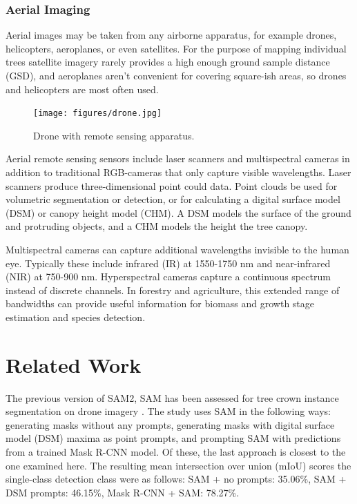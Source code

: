 \documentclass[english, 12pt, a4paper, sci, utf8, a-2b, online]{aaltothesis}
\begin{document}
\subsubsection{Aerial Imaging}

Aerial images may be taken from any airborne apparatus, for example drones, helicopters, aeroplanes, or even satellites. For the purpose of mapping individual trees satellite imagery rarely provides a high enough ground sample distance (GSD), and aeroplanes aren't convenient for covering square-ish areas, so drones and helicopters are most often used.

\begin{figure}[h]
    \centering
    \texttt{[image: figures/drone.jpg]}
    \caption{Drone with remote sensing apparatus.}
    \label{fig:drone}
\end{figure}

Aerial remote sensing sensors include laser scanners and multispectral cameras in addition to traditional RGB-cameras that only capture visible wavelengths. Laser scanners produce three-dimensional point could data. Point clouds be used for volumetric segmentation or detection, or for calculating a digital surface model (DSM) or canopy height model (CHM). A DSM models the surface of the ground and protruding objects, and a CHM models the height the tree canopy.
\newline
{}
\newline

Multispectral cameras can capture additional wavelengths invisible to the human eye. Typically these include infrared (IR) at 1550-1750 nm and near-infrared (NIR) at 750-900 nm. Hyperspectral cameras capture a continuous spectrum instead of discrete channels. In forestry and agriculture, this extended range of bandwidths can provide useful information for biomass and growth stage estimation and species detection. \cite{hyperspectral-agricultural}
\newline
{}
\newline

\newpage
\section{Related Work}

The previous version of SAM2, SAM has been assessed for tree crown instance segmentation on drone imagery \cite{sam-treecrown}. The study uses SAM in the following ways: generating masks without any prompts, generating masks with digital surface model (DSM) maxima as point prompts, and prompting SAM with predictions from a trained Mask R-CNN model. Of these, the last approach is closest to the one examined here. The resulting mean intersection over union (mIoU) scores the single-class detection class were as follows: SAM + no prompts: 35.06\%, SAM + DSM prompts: 46.15\%, Mask R-CNN + SAM: 78.27\%.
\end{document}

